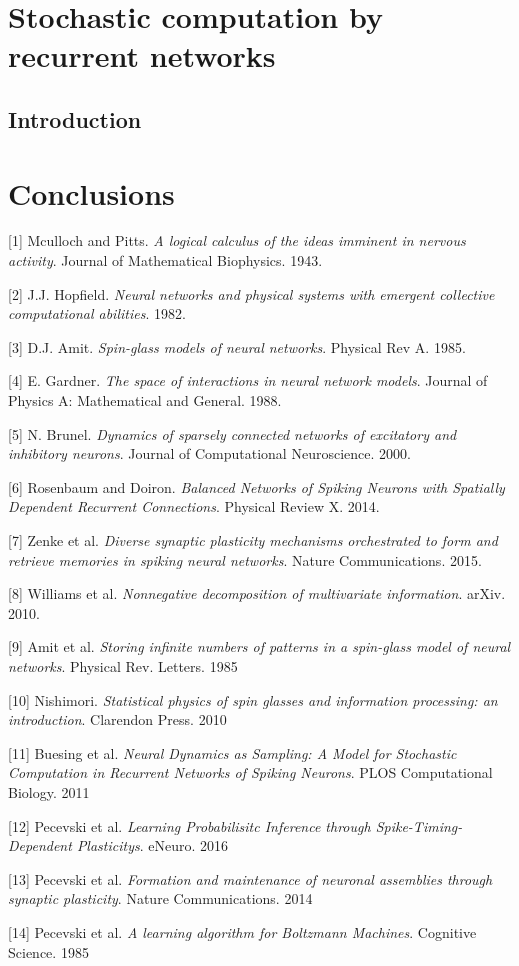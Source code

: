 \documentclass{ucetd}
\begin{document}
\chapter{Stochastic computation by recurrent networks}
\section{Introduction}

\chapter{Conclusions}


\makebibliography

[1] Mculloch and Pitts. \textit{A logical calculus of the ideas imminent in nervous activity}. Journal of Mathematical Biophysics. 1943.

[2] J.J. Hopfield. \textit{Neural networks and physical systems with emergent collective computational abilities}. 1982.

[3] D.J. Amit. \textit{Spin-glass models of neural networks}. Physical Rev A. 1985.

[4] E. Gardner. \textit{The space of interactions in neural network models}. Journal of Physics A: Mathematical and General. 1988.

[5] N. Brunel. \textit{Dynamics of sparsely connected networks of excitatory and inhibitory neurons}. Journal of Computational Neuroscience. 2000. 

[6] Rosenbaum and Doiron. \textit{Balanced Networks of Spiking Neurons with Spatially Dependent Recurrent Connections}. Physical Review X. 2014.

[7] Zenke et al. \textit{Diverse synaptic plasticity mechanisms
orchestrated to form and retrieve memories
in spiking neural networks}. Nature Communications. 2015.

[8] Williams et al. \textit{Nonnegative decomposition of multivariate information}. arXiv. 2010.

[9] Amit et al. \textit{Storing infinite numbers of patterns in a spin-glass model of neural networks}. Physical Rev. Letters. 1985

[10] Nishimori. \textit{Statistical physics of spin glasses and information processing: an introduction}. Clarendon Press. 2010

[11] Buesing et al. \textit{Neural Dynamics as Sampling: A Model for Stochastic Computation in Recurrent Networks of Spiking Neurons}. PLOS Computational Biology. 2011

[12] Pecevski et al. \textit{Learning Probabilisitc Inference through Spike-Timing-Dependent Plasticitys}. eNeuro. 2016

[13] Pecevski et al. \textit{Formation and maintenance of neuronal assemblies through synaptic plasticity}. Nature Communications. 2014

[14] Pecevski et al. \textit{A learning algorithm for Boltzmann Machines}. Cognitive Science. 1985

%
%
\end{document}
